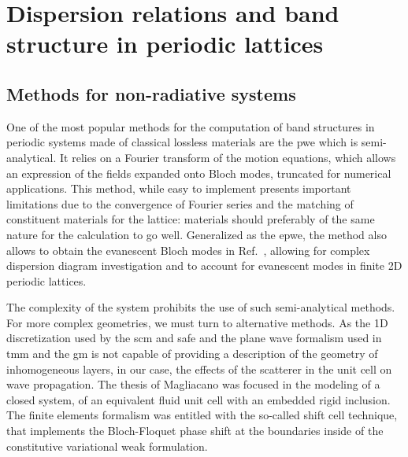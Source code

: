 \section{Dispersion relations and band structure in periodic lattices}
\label{sec:disp_perioic_chap1}
\subsection{Methods for non-radiative systems}
One of the most popular methods for the computation of band structures in periodic systems made of classical lossless materials are the \acrfull{pwe} which is semi-analytical. It relies on a Fourier transform of the motion equations, which allows an expression of the fields expanded onto Bloch modes, truncated for numerical applications. This method, while easy to implement presents important limitations due to the convergence of Fourier series and the matching of constituent materials for the lattice: materials should preferably of the same nature for the calculation to go well\cite{jimenez2021}. Generalized as the \acrfull{epwe}, the method also allows to obtain the evanescent Bloch modes in Ref.~\cite{schalcher2023}, allowing for complex dispersion diagram investigation and to account for evanescent modes in finite 2D periodic lattices. 

The complexity of the system prohibits the use of such semi-analytical methods. For more complex geometries, we must turn to alternative methods. As the 1D discretization used by the \acrshort{scm} and \acrshort{safe} and the plane wave formalism used in \acrshort{tmm} and the \acrshort{gm} is not capable of providing a description of the geometry of inhomogeneous layers, in our case, the effects of the scatterer in the unit cell on wave propagation. The thesis of Magliacano\cite{magliacano2020a} was focused in the modeling of a closed system, of an equivalent fluid unit cell with an embedded rigid inclusion. The finite elements formalism was entitled with the so-called shift cell technique, that implements the Bloch-Floquet phase shift at the boundaries inside of the constitutive variational weak formulation. 


